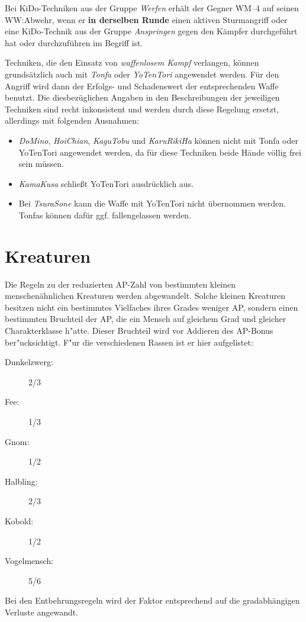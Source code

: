 \documentclass[10pt,a4paper,germanpar]{article}
\begin{document}
Bei KiDo-Techniken aus der Gruppe \emph{Werfen} erhält der Gegner
WM--4 auf seinen WW:Abwehr, wenn er \textbf{in derselben Runde} einen
aktiven Sturmangriff oder eine KiDo-Technik aus der Gruppe
\emph{Anspringen} gegen den Kämpfer durchgeführt hat oder
durchzuführen im Begriff ist.

Techniken, die den Einsatz von \emph{waffenlosem Kampf} verlangen,
können grundsätzlich auch mit \emph{Tonfa} oder \emph{YoTenTori}
angewendet werden. Für den Angriff wird dann der Erfolgs- und
Schadenswert der entsprechenden Waffe benutzt. Die diesbezüglichen
Angaben in den Beschreibungen der jeweiligen Techniken sind recht
inkonsistent und werden durch diese Regelung ersetzt, allerdings mit
folgenden Ausnahmen:
\begin{itemize}
\item \emph{DoMino}, \emph{HoiChian}, \emph{KaguTobu} und
  \emph{KaruRikiHa} können nicht mit Tonfa oder YoTenTori angewendet
  werden, da für diese Techniken beide Hände völlig frei sein müssen.
\item \emph{KamaKusa} schließt YoTenTori ausdrücklich aus.
\item Bei \emph{TsuraSone} kann die Waffe mit YoTenTori nicht
  übernommen werden. Tonfas können dafür ggf. fallengelassen werden.
\end{itemize}

\section{Kreaturen}

Die Regeln zu der reduzierten AP-Zahl von bestimmten kleinen
menschenähnlichen Kreaturen werden abgewandelt. Solche kleinen
Kreaturen besitzen nicht ein bestimmtes Vielfaches ihres Grades
weniger AP, sondern einen bestimmten Bruchteil der AP, die ein Mensch
auf gleichem Grad und gleicher Charakterklasse h"atte. Dieser
Bruchteil wird vor Addieren des AP-Bonus ber"ucksichtigt. F"ur die
verschiedenen Rassen ist er hier aufgelistet:
\begin{description}
\item[Dunkelzwerg:] 2/3
\item[Fee:] 1/3
\item[Gnom:] 1/2
\item[Halbling:] 2/3
\item[Kobold:] 1/2
\item[Vogelmensch:] 5/6
\end{description}

Bei den Entbehrungsregeln wird der Faktor entsprechend auf die
gradabhängigen Verluste angewandt.
\end{document}
